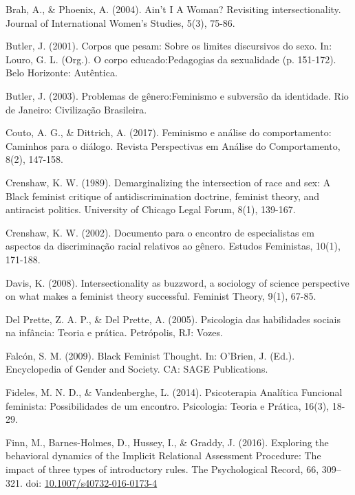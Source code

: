 \hangindent=25pt
\noindent Brah, A., \& Phoenix, A. (2004). Ain’t I A Woman? Revisiting intersectionality. Journal of International Women’s Studies, 5(3), 75-86.

\hangindent=25pt
\noindent Butler, J. (2001). Corpos que pesam: Sobre os limites discursivos do sexo. In: Louro, G. L. (Org.). O corpo educado:Pedagogias da sexualidade (p. 151-172). Belo Horizonte: Autêntica.

\hangindent=25pt
\noindent Butler, J. (2003). Problemas de gênero:Feminismo e subversão da identidade. Rio de Janeiro: Civilização Brasileira. 

\hangindent=25pt
\noindent Couto, A. G., \& Dittrich, A. (2017). Feminismo e análise do comportamento: Caminhos para o diálogo. Revista Perspectivas em Análise do Comportamento, 8(2), 147-158. 

\hangindent=25pt
\noindent Crenshaw, K. W. (1989). Demarginalizing the intersection of race and sex: A Black feminist critique of antidiscrimination doctrine, feminist theory, and antiracist politics. University of Chicago Legal Forum, 8(1), 139-167. 

\hangindent=25pt
\noindent Crenshaw, K. W. (2002). Documento para o encontro de especialistas em aspectos da discriminação racial relativos ao gênero. Estudos Feministas, 10(1), 171-188.

\hangindent=25pt
\noindent Davis, K. (2008). Intersectionality as buzzword, a sociology of science perspective on what makes a feminist theory successful. Feminist Theory, 9(1), 67-85. 

\hangindent=25pt
\noindent Del Prette, Z. A. P., \& Del Prette, A. (2005). Psicologia das habilidades sociais na infância: Teoria e prática. Petrópolis, RJ: Vozes.

\hangindent=25pt
\noindent Falcón, S. M. (2009). Black Feminist Thought. In: O’Brien, J. (Ed.). Encyclopedia of Gender and Society. CA: SAGE Publications. 

\hangindent=25pt
\noindent Fideles, M. N. D., \& Vandenberghe, L. (2014). Psicoterapia Analítica Funcional feminista: Possibilidades de um encontro. Psicologia: Teoria e Prática, 16(3), 18-29.

\hangindent=25pt
\noindent Finn, M., Barnes-Holmes, D., Hussey, I., \& Graddy, J. (2016). Exploring the behavioral dynamics of the Implicit Relational Assessment Procedure: The impact of three types of introductory rules. The Psychological Record, 66, 309–321. doi: \url{10.1007/s40732-016-0173-4}

